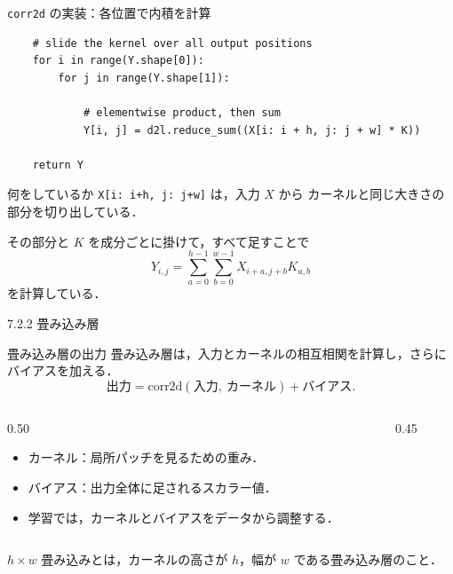 \documentclass[dvipdfmx,uplatex,unicode,9pt,aspectratio=169]{beamer}
\begin{document}
\begin{frame}[fragile]{\texttt{corr2d} の実装：各位置で内積を計算}
\begin{lstlisting}
    # slide the kernel over all output positions
    for i in range(Y.shape[0]):
        for j in range(Y.shape[1]):

            # elementwise product, then sum
            Y[i, j] = d2l.reduce_sum((X[i: i + h, j: j + w] * K))

    return Y
\end{lstlisting}

\begin{block}{何をしているか}
\texttt{X[i: i+h, j: j+w]} は，入力 $X$ から
カーネルと同じ大きさの部分を切り出している．

その部分と $K$ を成分ごとに掛けて，すべて足すことで
\[
Y_{i,j}
=
\sum_{a=0}^{h-1}\sum_{b=0}^{w-1}
X_{i+a,j+b}K_{a,b}
\]
を計算している．
\end{block}
\end{frame}

\begin{frame}[fragile]{7.2.2 畳み込み層}
\begin{block}{畳み込み層の出力}
畳み込み層は，入力とカーネルの相互相関を計算し，さらにバイアスを加える．
\[
\text{出力}=\text{corr2d}(\text{入力},\ \text{カーネル})+\text{バイアス}.
\]
\end{block}

\begin{columns}[T,onlytextwidth]
\begin{column}{0.50\textwidth}
\begin{itemize}
  \item \alert{カーネル}：局所パッチを見るための重み．
  \item \alert{バイアス}：出力全体に足されるスカラー値．
  \item 学習では，カーネルとバイアスをデータから調整する．
\end{itemize}
\end{column}
\begin{column}{0.45\textwidth}
\centering
{}
\end{column}
\end{columns}

\begin{seminaralertbox}
$h\times w$ 畳み込みとは，カーネルの高さが $h$，幅が $w$ である畳み込み層のこと．
\end{seminaralertbox}
\end{frame}
\end{document}
